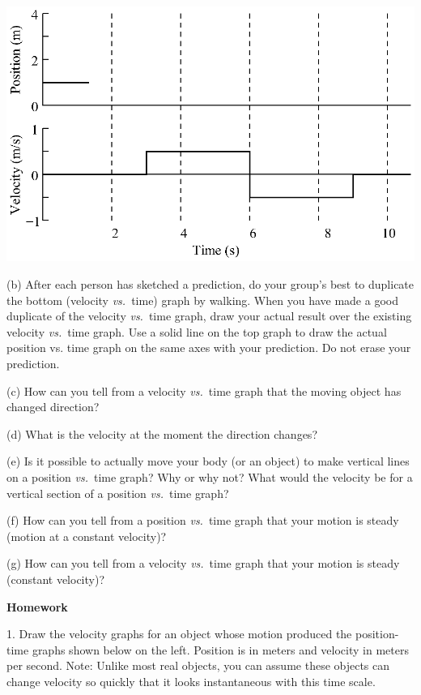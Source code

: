 \vspace{0.3cm}
{\par\centering \includegraphics{relating/relating_fig2.eps} \par}
\answerspace{0.3cm}

(b) After each person has sketched a prediction, do your group's best to duplicate the bottom (velocity \textit{vs.}~time) graph by walking. When you have made a good duplicate of the velocity \textit{vs.}~time graph, draw your actual result over the existing velocity \textit{vs.}~time graph. Use a solid line on the top graph to draw the actual position vs. time graph on the same axes with your prediction. Do not erase your prediction.

(c) How can you tell from a velocity \textit{vs.}~time graph that the moving object has
changed direction?
\answerspace{10mm}

(d) What is the velocity at the moment the direction changes? 
\answerspace{10mm}

(e) Is it possible to actually move your body (or an object) to make vertical
lines on a position \textit{vs.}~time graph? Why or why not? What would the velocity
be for a vertical section of a position \textit{vs.}~time graph? 
\answerspace{10mm}

(f) How can you tell from a position \textit{vs.}~time graph that your motion is steady
(motion at a constant velocity)? 
\answerspace{10mm}

\pagebreak[2]
(g) How can you tell from a velocity \textit{vs.}~time graph that your motion is steady
(constant velocity)? 
\answerspace{20mm}

\textbf{Homework} 

1. Draw the velocity graphs for an object whose motion produced the position-time
graphs shown below on the left. Position is in meters and velocity in meters
per second. Note: Unlike most real objects, you can assume these objects can
change velocity so quickly that it looks instantaneous with this time scale.

